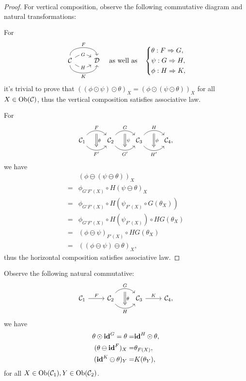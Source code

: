 \documentclass{article}
\begin{document}
\begin{proof}
	For vertical composition, observe the following commutative diagram and natural transformations:

	For
	\[\begin{tikzcd}
		\C
		\arrow[r, bend left =90, "F"]
		\arrow[r, bend left =35, "G" description] 
		\arrow[r, bend right=35, "H" description]
		\arrow[r, bend right=90, "K"'] &
		\D
	\end{tikzcd}\quad\text{as well as}\quad
	\left\{\begin{aligned}
		& \theta:F\Rightarrow G,\\
		& \psi:G\Rightarrow H,\\
		& \phi:H\Rightarrow K,
	\end{aligned}\right.\]
	it's trivial to prove that $((\phi\odot\psi)\odot\theta)_X=(\phi\odot(\psi\odot\theta))_X$ for all $X\in \mathrm{Ob}(\mathcal{C})$, thus the vertical composition satisfies associative law.

	For
	\[\begin{tikzcd}
		\C_1 \arrow[bend left=50, r, "F", ""' name=F] \arrow[bend right=50, r, "F'"', "" name=F'] &
		\C_2 \arrow[bend left=50, r, "G", ""' name=G] \arrow[bend right=50, r, "G'"', "" name=G'] &	
		\C_3 \arrow[bend left=50, r, "H", ""' name=H] \arrow[bend right=50, r, "H'"', "" name=H'] &
		\arrow[Rightarrow, from=F, to=F', "\theta"]
		\arrow[Rightarrow, from=G, to=G', "\psi"]
		\arrow[Rightarrow, from=H, to=H', "\phi"]
		\C_4,
	\end{tikzcd}\]
	we have
	\begin{align}
		 & (\phi\ominus(\psi\ominus\theta))_X\tag{Assumption}\\
		=& \phi_{G'F'(X)}\circ H(\psi\ominus\theta)_X\tag{Def: horizontal composition}\\
		=& \phi_{G'F'(X)}\circ H(\psi_{F'(X)}\circ G(\theta_X))\tag{Ditto}\\
		=& \phi_{G'F'(X)}\circ H(\psi_{F'(X)})\circ HG(\theta_X)\tag{Property of functor $H$}\\
		=& (\phi\ominus\psi)_{F'(X)}\circ HG(\theta_X)\tag{Def: horizontal composition}\\
		=& ((\phi\ominus\psi)\ominus\theta)_X\tag{Ditto},
	\end{align}
	thus the horizontal composition satisfies associative law.
\end{proof}


\begin{thm}
	Observe the following natural commutative:
	\[\begin{tikzcd}
		\C_1 \arrow[r,"F"] &
		\C_2 \arrow[r, bend left =50, "G", ""' name=G] \arrow[r, bend right=50, "H"', "" name=H] &
		\C_3 \arrow[r, "K"] &
		\arrow[Rightarrow, from=G, to=H, "\theta"]
		\C_4,
	\end{tikzcd}\]
	we have
	\begin{align}
		\theta\odot\mathbf{id}^G=\theta=&\mathbf{id}^H\odot\theta,\label{1}\\
		(\theta\ominus\mathbf{id}^F)_X=&\theta_{F(X)},\label{2}\\
		(\mathbf{id}^K\ominus\theta)_Y=&K(\theta_Y),\label{3}
	\end{align}
	for all $X\in\mathrm{Ob}(\mathcal{C}_1),Y\in\mathrm{Ob}(\mathcal{C}_2)$.
\end{thm}
\end{document}
